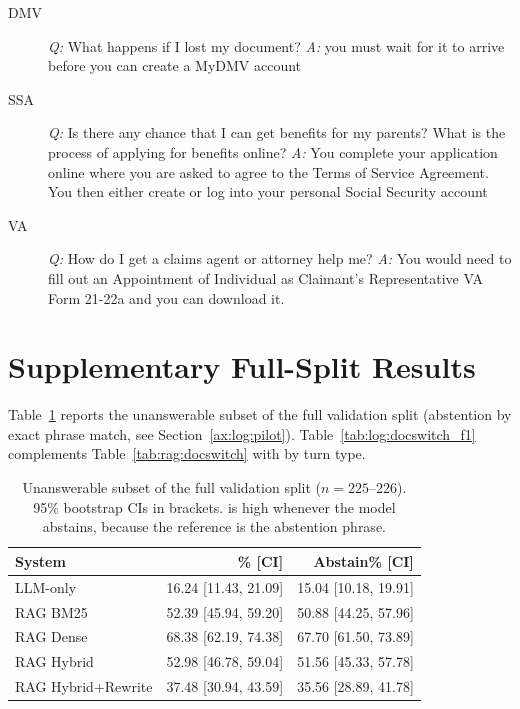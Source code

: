 \begin{description}
    \item[DMV] \emph{Q:} What happens if I lost my document?
               \emph{A:} you must wait for it to arrive before you can create a
               MyDMV account
    \item[SSA] \emph{Q:} Is there any chance that I can get benefits for my parents?
               What is the process of applying for benefits online?
               \emph{A:} You complete your application online where you are asked to
               agree to the Terms of Service Agreement. You then either create or log
               into your personal Social Security account
    \item[VA]  \emph{Q:} How do I get a claims agent or attorney help me?
               \emph{A:} You would need to fill out an Appointment of Individual as
               Claimant's Representative VA Form 21-22a and you can download it.
\end{description}


\section{Supplementary Full-Split Results}\label{ax:log:fullsplit}

Table~\ref{tab:log:unans} reports the unanswerable subset of the full validation
split (abstention by exact phrase match, see Section~\ref{ax:log:pilot}).
Table~\ref{tab:log:docswitch_f1} complements Table~\ref{tab:rag:docswitch} with
\fone{} by turn type.

\begin{table}[ht]
    \centering
    \caption{Unanswerable subset of the full validation split ($n = 225$--$226$).
             95\% bootstrap CIs in brackets. \fone{} is high whenever the model
             abstains, because the reference is the abstention phrase.}
    \label{tab:log:unans}
    \begin{tabular}{lrr}
        \toprule
        System & \fone{}\% [CI] & Abstain\% [CI] \\
        \midrule
        LLM-only           & 16.24 [11.43, 21.09] & 15.04 [10.18, 19.91] \\
        RAG BM25           & 52.39 [45.94, 59.20] & 50.88 [44.25, 57.96] \\
        RAG Dense          & 68.38 [62.19, 74.38] & 67.70 [61.50, 73.89] \\
        RAG Hybrid         & 52.98 [46.78, 59.04] & 51.56 [45.33, 57.78] \\
        RAG Hybrid+Rewrite & 37.48 [30.94, 43.59] & 35.56 [28.89, 41.78] \\
        \bottomrule
    \end{tabular}
\end{table}

